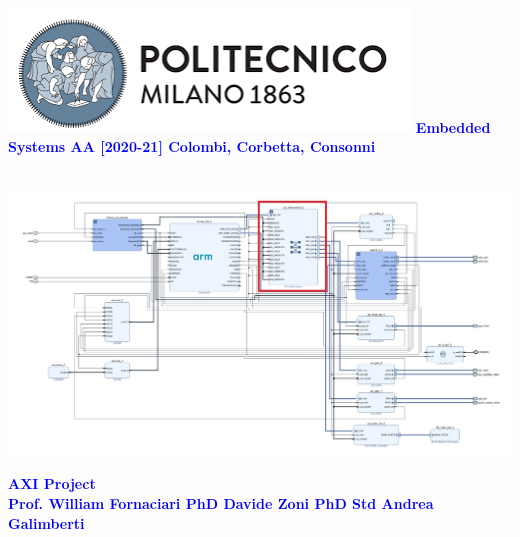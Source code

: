 






\begin{titlepage}


{\begin{table}[t!]
{\includegraphics[width=0.8\textwidth]{./../../img/Images/PolimiLogo}}
\newline
\textcolor{Blue}{\textbf{\Large{Embedded Systems AA [2020-21] } \newline \small{Colombi, Corbetta, Consonni}}}
\end{table}}~ \\ [1cm]


\includegraphics[width=1\textwidth]{./../../img/Images/axi}\\ [1cm]

\begin{flushleft}

{\textcolor{Blue}{\textbf{\Huge{AXI Project}}}} \\ [1cm]

\textcolor{Blue}{\textbf{\Large{Prof. William Fornaciari} \newline \Large{PhD Davide Zoni} \newline \Large{PhD Std Andrea Galimberti}}}

\end{flushleft}

\end{titlepage}

